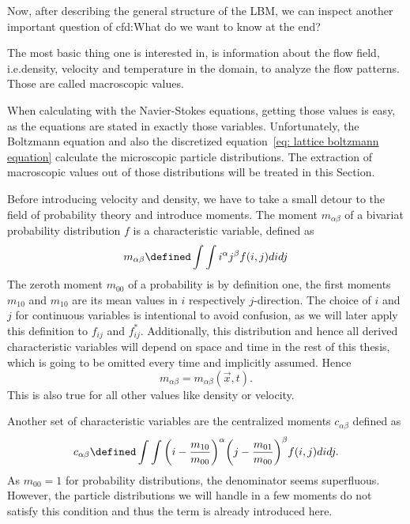 Now, after describing the general structure of the LBM, we can inspect another important question of \gls{cfd}:\@ What do we want to know at the end?

The most basic thing one is interested in, is information about the flow field, i.e.\@ density, velocity and temperature in the domain, to analyze the flow patterns.
Those are called macroscopic values.

When calculating with the Navier-Stokes equations, getting those values is easy, as the equations are stated in exactly those variables.
Unfortunately, the Boltzmann equation and also the discretized equation~\eqref{eq: lattice boltzmann equation} calculate the microscopic particle distributions.
The extraction of macroscopic values out of those distributions will be treated in this Section.

Before introducing velocity and density, we have to take a small detour to the field of probability theory and introduce moments.
The moment $m_{\alpha\beta}$ of a bivariat probability distribution $f$ is a characteristic variable, defined as
\begin{equation}
  \label{eq: moments continuous}
  m_{\alpha\beta} \defined \int\int i^\alpha j^\beta f(i,j) didj
\end{equation}
The zeroth moment $m_{00}$ of a probability is by definition one, the first moments $m_{10}$ and $m_{10}$ are its mean values in $i$ respectively $j$-direction.
The choice of $i$ and $j$ for continuous variables is intentional to avoid confusion, as we will later apply this definition to $f_{ij}$ and $f_{ij}^*$.
Additionally, this distribution and hence all derived characteristic variables will depend on space and time in the rest of this thesis, which is going to be omitted every time and implicitly assumed. Hence
\begin{equation}
  m_{\alpha\beta} = m_{\alpha\beta}(\vec{x},t).
\end{equation}
This is also true for all other values like density or velocity.

Another set of characteristic variables are the centralized moments $c_{\alpha\beta}$ defined as
\begin{equation}
  \label{eq: central moments continuous}
  c_{\alpha\beta} \defined \int\int {\left(i - \frac{m_{10}}{m_{00}}\right)}^\alpha {\left(j-\frac{m_{01}}{m_{00}}\right)}^\beta f(i,j) didj.
\end{equation}
As $m_{00}=1$ for probability distributions, the denominator seems superfluous.
However, the particle distributions we will handle in a few moments do not satisfy this condition and thus the term is already introduced here.

